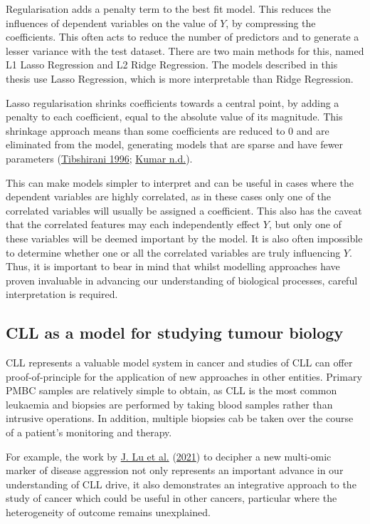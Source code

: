 \documentclass[11pt, a4paper, twosided]{book}
\begin{document}
Regularisation adds a penalty term to the best fit model. This reduces the influences of dependent variables on the value of \(Y\), by compressing the coefficients. This often acts to reduce the number of predictors and to generate a lesser variance with the test dataset. There are two main methods for this, named L1 Lasso Regression and L2 Ridge Regression. The models described in this thesis use Lasso Regression, which is more interpretable than Ridge Regression.

Lasso regularisation shrinks coefficients towards a central point, by adding a penalty to each coefficient, equal to the absolute value of its magnitude. This shrinkage approach means than some coefficients are reduced to 0 and are eliminated from the model, generating models that are sparse and have fewer parameters (\protect\hyperlink{ref-Tibshirani1996}{Tibshirani 1996}; \protect\hyperlink{ref-Kumar}{Kumar n.d.}).

This can make models simpler to interpret and can be useful in cases where the dependent variables are highly correlated, as in these cases only one of the correlated variables will usually be assigned a coefficient. This also has the caveat that the correlated features may each independently effect \(Y\), but only one of these variables will be deemed important by the model. It is also often impossible to determine whether one or all the correlated variables are truly influencing \(Y\). Thus, it is important to bear in mind that whilst modelling approaches have proven invaluable in advancing our understanding of biological processes, careful interpretation is required.

\hypertarget{CLL-model-intro}{%
\subsection{CLL as a model for studying tumour biology}\label{CLL-model-intro}}

CLL represents a valuable model system in cancer and studies of CLL can offer proof-of-principle for the application of new approaches in other entities. Primary PMBC samples are relatively simple to obtain, as CLL is the most common leukaemia and biopsies are performed by taking blood samples rather than intrusive operations. In addition, multiple biopsies cab be taken over the course of a patient's monitoring and therapy.

For example, the work by \protect\hyperlink{ref-Lu2021}{J. Lu et al.} (\protect\hyperlink{ref-Lu2021}{2021}) to decipher a new multi-omic marker of disease aggression not only represents an important advance in our understanding of CLL drive, it also demonstrates an integrative approach to the study of cancer which could be useful in other cancers, particular where the heterogeneity of outcome remains unexplained.
\end{document}
